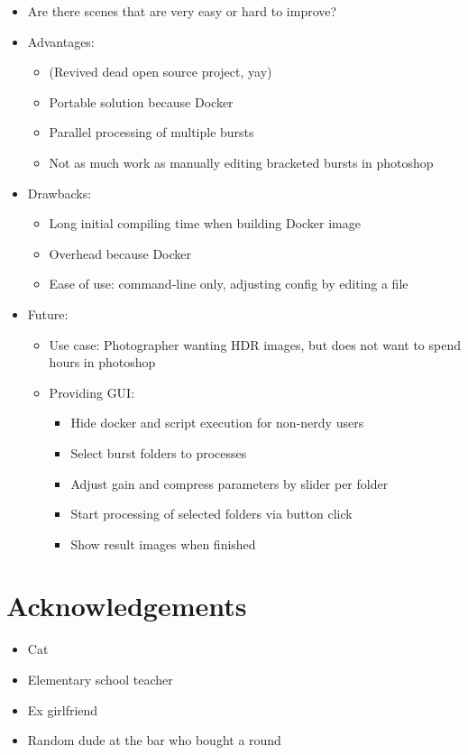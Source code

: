 \documentclass{egpubl}
\begin{document}
\begin{itemize}
      \item Are there scenes that are very easy or hard to improve?
      \item Advantages:
      \begin{itemize}
            \item (Revived dead open source project, yay)
            \item Portable solution because Docker
            \item Parallel processing of multiple bursts
            \item Not as much work as manually editing bracketed bursts in photoshop
      \end{itemize}
      \item Drawbacks:
      \begin{itemize}
            \item Long initial compiling time when building Docker image
            \item Overhead because Docker
            \item Ease of use: command-line only, adjusting config by editing a file
      \end{itemize}
      \item Future:
      \begin{itemize}
            \item Use case: Photographer wanting HDR images, but does not want to spend
                  hours in photoshop
            \item Providing GUI:
            \begin{itemize}
                  \item Hide docker and script execution for non-nerdy users
                  \item Select burst folders to processes
                  \item Adjust gain and compress parameters by slider per folder
                  \item Start processing of selected folders via button click
                  \item Show result images when finished
            \end{itemize}
      \end{itemize}
\end{itemize}
\label{sec:conclusion}


\section{Acknowledgements}
\label{sec:acknowledgements}
\begin{itemize}
      \item Cat
      \item Elementary school teacher
      \item Ex girlfriend
      \item Random dude at the bar who bought a round
\end{itemize}


%


\end{document}
